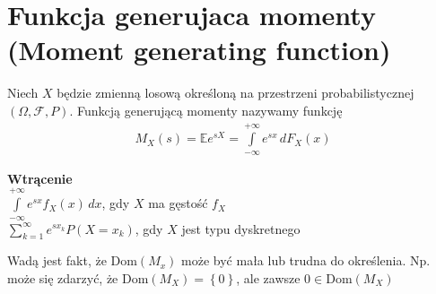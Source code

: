 \section{Funkcja generujaca momenty (Moment generating function)}
\begin{defi}
Niech $ X $ będzie zmienną losową określoną na przestrzeni probabilistycznej $(\Omega,\mathcal F,P)$. Funkcją generującą momenty nazywamy funkcję
\begin{gather*}
M_X(s)=\mathbb E e^{sX}=\int\limits_{-\infty }^{+\infty }e^{sx}\,dF_X(x)
\end{gather*} 
\begin{center}
	{\small \textbf{Wtrącenie}\\
	$ \int\limits_{-\infty }^{+\infty }e^{sx}f_X(x)\,dx $, gdy $ X $ ma gęstość $ f_X$ \\
	$\sum_{k=1}^{\infty }e^{sx_k}P\left(X=x_k\right) $, gdy $ X $ jest typu dyskretnego
	}
\end{center}
\end{defi}
Wadą jest fakt, że Dom$ \left(M_x\right) $ może być mała lub trudna do określenia. Np. może się zdarzyć, że Dom$ \left(M_X\right)=\left\{0\right\} $, ale zawsze $ 0\in\text{Dom}\left(M_X\right) $

